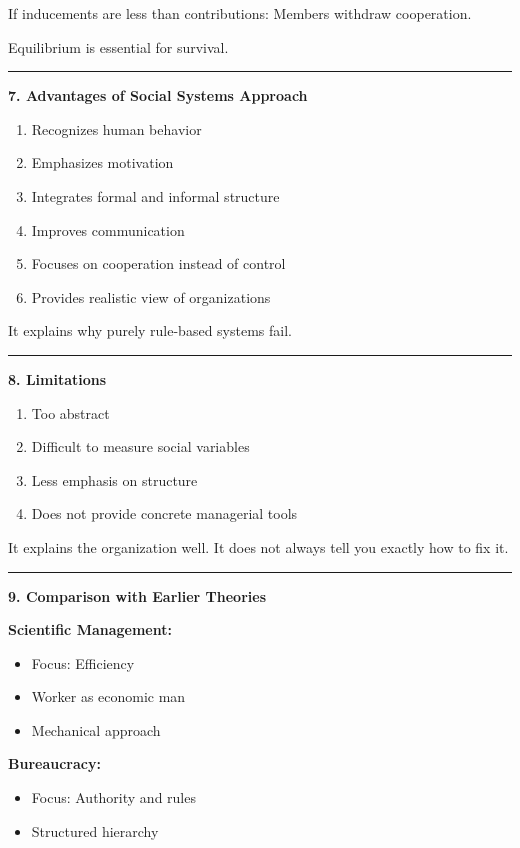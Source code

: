 \documentclass[10pt,a4paper]{article}
\newcommand{\separator}{\vspace{0.4em}\noindent\rule{\linewidth}{0.6pt}\vspace{0.4em}}
\begin{document}
If inducements are less than contributions: Members withdraw cooperation.

Equilibrium is essential for survival.

\separator

\textbf{7. Advantages of Social Systems Approach}

\begin{enumerate}
  \item Recognizes human behavior
  \item Emphasizes motivation
  \item Integrates formal and informal structure
  \item Improves communication
  \item Focuses on cooperation instead of control
  \item Provides realistic view of organizations
\end{enumerate}

It explains why purely rule-based systems fail.

\separator

\textbf{8. Limitations}

\begin{enumerate}
  \item Too abstract
  \item Difficult to measure social variables
  \item Less emphasis on structure
  \item Does not provide concrete managerial tools
\end{enumerate}

It explains the organization well.
It does not always tell you exactly how to fix it.

\separator

\textbf{9. Comparison with Earlier Theories}

\textbf{Scientific Management:}
\begin{itemize}
  \item Focus: Efficiency
  \item Worker as economic man
  \item Mechanical approach
\end{itemize}

\textbf{Bureaucracy:}
\begin{itemize}
  \item Focus: Authority and rules
  \item Structured hierarchy
\end{itemize}
\end{document}
